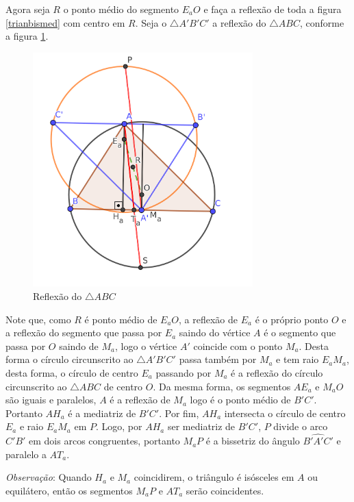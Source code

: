 \documentclass[12pt, openright, a4paper, brazil, openany, oneside]{abntex2}
\begin{document}
Agora seja $R$ o ponto médio do segmento $E_{a}O$ e faça a reflexão de toda a figura \ref{trianbismed} com centro em $R$. Seja o  $\triangle A'B'C'$ a reflexão do $\triangle ABC$, conforme a figura \ref{trianref}.

\begin{figure}[h]
	
	\center
	
	\includegraphics[width=8.5cm]{trianreflexao.png}
	\caption{Reflexão do $\triangle ABC$ \label{trianref}}
	
\end{figure}

Note que, como $R$ é ponto médio de $E_{a}O$, a reflexão de $E_a$ é o próprio ponto $O$ e a reflexão do segmento que passa por $E_a$ saindo do vértice $A$ é o segmento que passa por $O$ saindo de $M_a$, logo o vértice $A'$ coincide com o ponto $M_a$. Desta forma o círculo circunscrito ao $\triangle A'B'C'$ passa também por $M_a$ e tem raio $E_{a}M_{a}$, desta forma, o círculo de centro $E_a$ passando por $M_a$ é a reflexão do círculo circunscrito ao $\triangle ABC$ de centro $O$. Da mesma forma, os segmentos $AE_a$ e $M_{a}O$ são iguais e paralelos, $A$ é a reflexão de $M_a$ logo é o ponto médio de $B'C'$. Portanto $AH_a$ é a mediatriz de $B'C'$. Por fim, $AH_a$ intersecta o círculo de centro $E_a$ e raio $E_{a}M_a$ em $P$. Logo, por $AH_a$ ser mediatriz de $B'C'$, $P$ divide o arco $C'B'$ em dois arcos congruentes, portanto $M_aP$ é a bissetriz do ângulo $\hat{B'A'C'}$ e paralelo a $AT_a$.

\textit{Observação}: Quando $H_a$ e $M_a$ coincidirem, o triângulo é isósceles em $A$ ou equilátero, então os segmentos $M_{a}P$ e $AT_a$ serão coincidentes.
\end{document}
